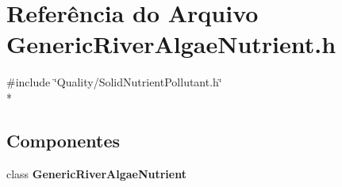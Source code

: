 \section{Referência do Arquivo Generic\+River\+Algae\+Nutrient.\+h}
\label{_generic_river_algae_nutrient_8h}
{\ttfamily \#include \char`\"{}Quality/\+Solid\+Nutrient\+Pollutant.\+h\char`\"{}}\\*
\subsection*{Componentes}
\begin{DoxyCompactItemize}
\item 
class {\bf Generic\+River\+Algae\+Nutrient}
\end{DoxyCompactItemize}
